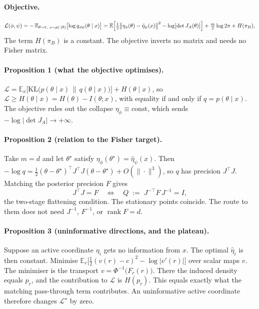 \documentclass[11pt, letterpaper]{article}
\theoremstyle{definition}
\begin{document}
\paragraph{Objective.}
\begin{equation}
  \mathcal{L}(\phi,\psi)
  = -\,\mathbb{E}_{\theta\sim\pi,\;x\sim p(\cdot|\theta)}\bigl[\log q_{\phi\psi}(\theta\mid x)\bigr]
  = \mathbb{E}\Bigl[\tfrac12\bigl\|\eta_\phi(\theta)-\hat\eta_\psi(x)\bigr\|^2
    - \log\bigl|\det J_A(\theta)\bigr|\Bigr]
    + \tfrac{m}{2}\log 2\pi + H(\pi_B),
  \label{eq:loss}
\end{equation}
The term $H(\pi_B)$ is a constant. The objective inverts no matrix and needs no
Fisher matrix.

\paragraph{Proposition 1 (what the objective optimises).}
$\mathcal{L}=\mathbb{E}_x\bigl[\mathrm{KL}\bigl(p(\theta\mid x)\,\|\,q(\theta\mid x)\bigr)\bigr]+H(\theta\mid x)$,
so $\mathcal{L}\ge H(\theta\mid x)=H(\theta)-I(\theta;x)$, with equality if and
only if $q=p(\theta\mid x)$. The objective rules out the collapse
$\eta_\phi\equiv\mathrm{const}$, which sends $-\log|\det J_A|\to+\infty$.

\paragraph{Proposition 2 (relation to the Fisher target).}
Take $m=d$ and let $\theta^\star$ satisfy $\eta_\phi(\theta^\star)=\hat\eta_\psi(x)$.
Then $-\log q=\tfrac12(\theta-\theta^\star)^\top J^\top J(\theta-\theta^\star)+O(\|\cdot\|^3)$,
so $q$ has precision $J^\top J$. Matching the posterior precision $F$ gives
\begin{equation}
  J^\top J = F
  \quad\Longleftrightarrow\quad
  Q \;:=\; J^{-\top} F\, J^{-1} = I ,
\end{equation}
the two-stage flattening condition. The stationary points coincide. The route
to them does not need $J^{-1}$, $F^{-1}$, or $\operatorname{rank}F=d$.

\paragraph{Proposition 3 (uninformative directions, and the plateau).}
Suppose an active coordinate $\eta_i$ gets no information from $x$. The optimal
$\hat\eta_i$ is then constant. Minimise
$\mathbb{E}_{r}\bigl[\tfrac12(v(r)-c)^2-\log|v'(r)|\bigr]$ over scalar maps $v$.
The minimiser is the transport $v=\Phi^{-1}\!\bigl(F_r(r)\bigr)$. There the
induced density equals $p_r$, and the contribution to $\mathcal{L}$ is $H(p_r)$.
This equals exactly what the matching pass-through term contributes. An
uninformative active coordinate therefore changes $\mathcal{L}^\star$ by zero.
\end{document}
